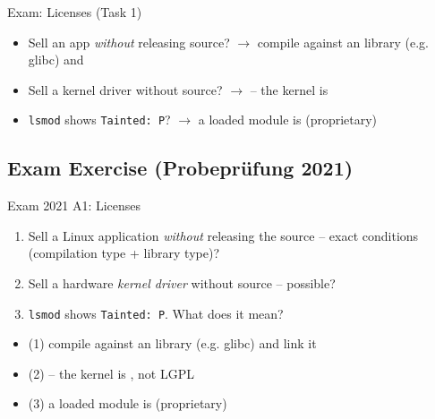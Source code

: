 \begin{example2}{Exam: Licenses (Task 1)}
    \begin{itemize}
        \item Sell an app \emph{without} releasing source? $\to$ compile against an
               library (e.g. glibc) and 
        \item Sell a kernel driver without source? $\to$  -- the kernel
              is 
        \item \texttt{lsmod} shows \texttt{Tainted: P}? $\to$ a loaded module is
               (proprietary)
    \end{itemize}
\end{example2}

\subsection{Exam Exercise (Probepr\"ufung 2021)}

\begin{example2}{Exam 2021 A1: Licenses}
    \begin{enumerate}
        \item Sell a Linux application \emph{without} releasing the source -- exact
              conditions (compilation type + library type)?
        \item Sell a hardware \emph{kernel driver} without source -- possible?
        \item \texttt{lsmod} shows \texttt{Tainted: P}. What does it mean?
    \end{enumerate}
    \tcblower
    \begin{itemize}
        \item (1) compile against an  library (e.g. glibc) and link
              it 
        \item (2)  -- the kernel is , not LGPL
        \item (3) a loaded module is  (proprietary)
    \end{itemize}
\end{example2}

\raggedcolumns
